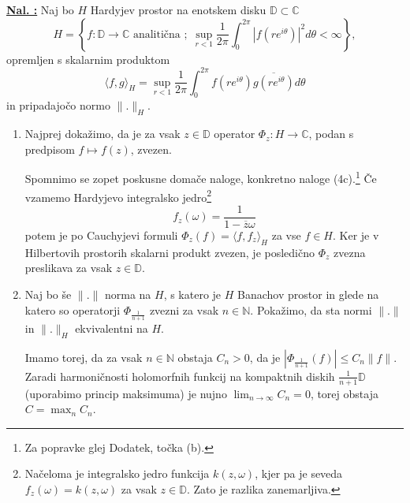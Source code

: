 \documentclass[a4paper, 12pt]{article}
\newcommand{\D}{\mathbb{D}}
\newcommand{\N}{\mathbb{N}}
\newcommand{\C}{\mathbb{C}}
\newcounter{excounter}[section]
\newenvironment{Exercise}
    {\refstepcounter{excounter}\underline{\textbf{Nal. \theexcounter:}}}
    {\par\vspace{\baselineskip}}
\begin{document}
\begin{Exercise}
    Naj bo $H$ Hardyjev prostor na enotskem disku $\D \subset \C$
    \[
        H = \left\{ f \colon \D \to \C \text{ analitična } ; \;
        \sup_{r < 1} \frac{1}{2\pi} \int_{0}^{2\pi} |f(re^{i\theta})|^2 d\theta < \infty\right\},
    \]
    opremljen s skalarnim produktom
    \[
        \langle f, g \rangle_H = \sup_{r < 1} \frac{1}{2\pi} \int_{0}^{2\pi} f(re^{i\theta})\overline{g(re^{i\theta})} d\theta
    \]
    in pripadajočo normo $\|.\|_H$.

    \begin{enumerate}[label=(\alph*)]
        \item
            Najprej dokažimo, da je za vsak $z \in \D$ operator $\Phi_z\colon H \to \C$,
            podan s predpisom $f \mapsto f(z)$, zvezen.

            Spomnimo se zopet poskusne domače naloge, konkretno naloge (4c).\footnote{
                Za popravke glej Dodatek, točka (b).}
            Če vzamemo Hardyjevo integralsko jedro\footnote{
                Načeloma je integralsko jedro funkcija $k(z, \omega)$,
                kjer pa je seveda $f_z(\omega) = k(z,\omega)$ za vsak $z \in \D$.
                Zato je razlika zanemarljiva.}
            \[
                f_z(\omega) = \frac{1}{1 - \overline{z}\omega}
            \]
            potem je po Cauchyjevi formuli $\Phi_z(f) = \langle f, f_z \rangle_H$ za vse $f \in H$.
            Ker je v Hilbertovih prostorih skalarni produkt zvezen,
            je posledično $\Phi_z$ zvezna preslikava za vsak $z \in \D$.
        \item
            Naj bo še $\|.\|$ norma na $H$, s katero je $H$ Banachov prostor
            in glede na katero so operatorji $\Phi_{\frac{1}{n+1}}$ zvezni za vsak $ n \in \N$.
            Pokažimo, da sta normi $\|.\|$ in $\|.\|_H$ ekvivalentni na $H$.

            Imamo torej, da za vsak $n \in \N$ obstaja $C_n > 0$,
            da je $| \Phi_{\frac{1}{n+1}}(f) | \leq C_n \|f\|$.
            Zaradi harmoničnosti holomorfnih funkcij na kompaktnih diskih $\frac{1}{n+1}\D$
            (uporabimo princip maksimuma)
            je nujno $\lim_{n \to \infty} C_n = 0$, torej obstaja $C = \max_n C_n$.


\end{enumerate}
\end{Exercise}
\end{document}
